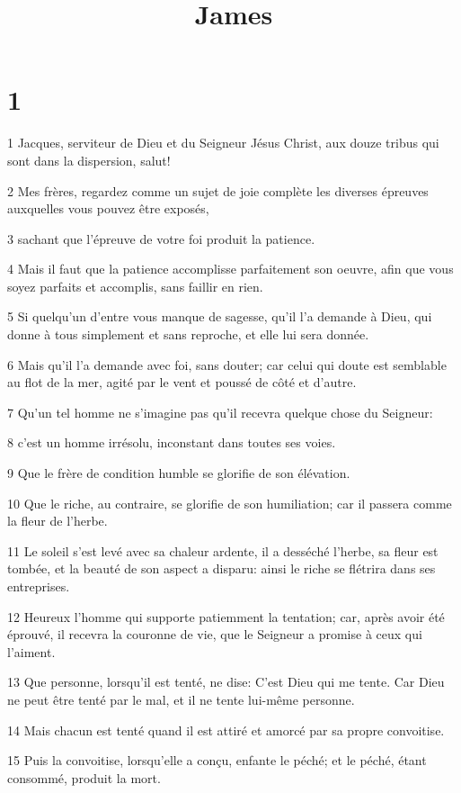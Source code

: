 

\title{James}


\chapter{1}

\par 1 Jacques, serviteur de Dieu et du Seigneur Jésus Christ, aux douze tribus qui sont dans la dispersion, salut!
\par 2 Mes frères, regardez comme un sujet de joie complète les diverses épreuves auxquelles vous pouvez être exposés,
\par 3 sachant que l'épreuve de votre foi produit la patience.
\par 4 Mais il faut que la patience accomplisse parfaitement son oeuvre, afin que vous soyez parfaits et accomplis, sans faillir en rien.
\par 5 Si quelqu'un d'entre vous manque de sagesse, qu'il l'a demande à Dieu, qui donne à tous simplement et sans reproche, et elle lui sera donnée.
\par 6 Mais qu'il l'a demande avec foi, sans douter; car celui qui doute est semblable au flot de la mer, agité par le vent et poussé de côté et d'autre.
\par 7 Qu'un tel homme ne s'imagine pas qu'il recevra quelque chose du Seigneur:
\par 8 c'est un homme irrésolu, inconstant dans toutes ses voies.
\par 9 Que le frère de condition humble se glorifie de son élévation.
\par 10 Que le riche, au contraire, se glorifie de son humiliation; car il passera comme la fleur de l'herbe.
\par 11 Le soleil s'est levé avec sa chaleur ardente, il a desséché l'herbe, sa fleur est tombée, et la beauté de son aspect a disparu: ainsi le riche se flétrira dans ses entreprises.
\par 12 Heureux l'homme qui supporte patiemment la tentation; car, après avoir été éprouvé, il recevra la couronne de vie, que le Seigneur a promise à ceux qui l'aiment.
\par 13 Que personne, lorsqu'il est tenté, ne dise: C'est Dieu qui me tente. Car Dieu ne peut être tenté par le mal, et il ne tente lui-même personne.
\par 14 Mais chacun est tenté quand il est attiré et amorcé par sa propre convoitise.
\par 15 Puis la convoitise, lorsqu'elle a conçu, enfante le péché; et le péché, étant consommé, produit la mort.
